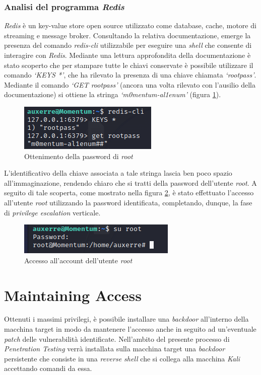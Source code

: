 \subsubsection{Analisi del programma \emph{Redis}}
\emph{Redis} \cite{redis} è un key-value store open source utilizzato come database, cache, motore di streaming e message broker. Consultando la relativa documentazione, emerge la presenza del comando \emph{redis-cli} utilizzabile per eseguire una \emph{shell} che consente di interagire con \emph{Redis}. Mediante una lettura approfondita della documentazione è stato scoperto che per stampare tutte le chiavi conservate è possibile utilizzare il comando \emph{`KEYS *'}, che ha rilevato la presenza di una chiave chiamata \emph{`rootpass'}. Mediante il comando \emph{`GET rootpass'} (ancora una volta rilevato con l'ausilio della documentazione) si ottiene la stringa \emph{`m0mentum-al1enum'} (figura \ref{fig:rediscli}). 
\begin{figure}[h]
    \centering
    \includegraphics[scale=1]{capitoli/images/rediscli.png}
    \caption{Ottenimento della password di \emph{root}}
    \label{fig:rediscli}
\end{figure}

L'identificativo della chiave associata a tale stringa lascia ben poco spazio all'immaginazione, rendendo chiaro che si tratti della password dell'utente \emph{root}. A seguito di tale scoperta, come mostrato nella figura \ref{fig:root}, è stato effettuato l'accesso all'utente \emph{root} utilizzando la password identificata, completando, dunque, la fase di \emph{privilege escalation} verticale.
\begin{figure}[h]
    \centering
    \includegraphics[scale=1]{capitoli/images/root.png}
    \caption{Accesso all'account dell'utente \emph{root}}
    \label{fig:root}
\end{figure}
\section{Maintaining Access}
Ottenuti i massimi privilegi, è possibile installare una \emph{backdoor} all'interno della macchina target in modo da mantenere l'accesso anche in seguito ad un'eventuale \emph{patch} delle vulnerabilità identificate. Nell'ambito del presente processo di \emph{Penetration Testing} verrà installata sulla macchina target una \emph{backdoor} persistente che consiste in una \emph{reverse shell} che si collega alla macchina \emph{Kali} accettando comandi da essa.

